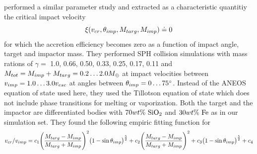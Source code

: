 \cite{2010ApJ...714L..21K} performed a similar parameter study and extracted as a characteristic quantitiy the critical impact velocity
\begin{equation}
\xi(v_{cr}, \theta_{imp}, M_{targ}, M_{imp}) \doteq 0
\end{equation}
for which the accretion efficiency becomes zero as a function of impact angle, target and impactor mass. They performed SPH collision simulations with mass rations of $\gamma =$ 1.0, 0.66, 0.50, 0.33, 0.25, 0.17, 0.11 and $M_{tot} = M_{imp} + M_{targ} = 0.2 \dots 2.0 M_{\oplus}$ at impact velocities between $v_{imp} = 1.0 \dots 3.0 v_{esc}$ at angles between $\theta_{imp} = 0 \dots 75 ^\circ$. Instead of the ANEOS equation of state used here, they used the Tillotson equation of state \cite{Melosh:1989p996} which does not include phase transitions for melting or vaporization. Both the target and the impactor are differentiated bodies with $70 wt\mathrm{\%}~\mathrm{SiO}_2$ and $30 wt\mathrm{\%}~\mathrm{Fe}$ as in our \css simulation set. They found the following empiric fitting function for
\begin{equation}
\label{ch03_eq002}
v_{cr} / v_{imp} = c_1 \Bigg( \frac{M_{targ} - M_{imp}}{M_{targ} + M_{imp}} \Bigg)^2 \big( 1 - \sin{\theta_{imp}} \big)^\frac{5}{2} + c_2 \Bigg( \frac{M_{targ} - M_{imp}}{M_{targ} + M_{imp}} \Bigg)^2 + c_3 \big( 1 - \sin{\theta_{imp}} \big)^\frac{5}{2}  + c_4
\end{equation}
